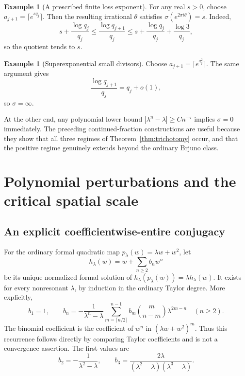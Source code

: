 \documentclass[11pt,a4paper]{article}
\numberwithin{equation}{section}
\theoremstyle{definition}
\newtheorem{example}[theorem]{Example}
\theoremstyle{remark}
\begin{document}
\begin{example}[A prescribed finite loss exponent]\label{ex:positive}
For any real $s>0$, choose
$a_{j+1}=\lceil e^{s q_j}\rceil$. Then the resulting irrational
$\theta$ satisfies $\sigma(e^{2\pi i\theta})=s$.
Indeed,
\[
 s+\frac{\log q_j}{q_j}
 \le\frac{\log q_{j+1}}{q_j}
 \le s+\frac{\log q_j}{q_j}+\frac{\log3}{q_j},
\]
so the quotient tends to $s$.
\end{example}

\begin{example}[Superexponential small divisors]\label{ex:infinite}
Choose $a_{j+1}=\lceil e^{q_j^2}\rceil$. The same argument gives
\[
 \frac{\log q_{j+1}}{q_j}=q_j+o(1),
\]
so $\sigma=\infty$.
\end{example}

At the other end, any polynomial lower bound
$|\lambda^n-\lambda|\ge Cn^{-\tau}$ implies $\sigma=0$ immediately.
The preceding continued-fraction constructions are useful because they
show that all three regimes of Theorem~\ref{thm:trichotomy} occur, and that
the positive regime genuinely extends beyond the ordinary Brjuno class.

\section{Polynomial perturbations and the critical spatial scale}\label{sec:quadratic}

\subsection{An explicit coefficientwise-entire conjugacy}

For the ordinary formal quadratic map
$p_\lambda(w)=\lambda w+w^2$, let
\[
 h_\lambda(w)=w+\sum_{n\ge2}b_n w^n
\]
be its unique normalized formal solution of
$h_\lambda(p_\lambda(w))=\lambda h_\lambda(w)$.
It exists for every nonresonant $\lambda$, by induction in the ordinary
Taylor degree. More explicitly,
\begin{equation}\label{eq:quadraticrecurrence}
 b_1=1,\qquad
 b_n=-\frac{1}{\lambda^n-\lambda}
       \sum_{m=\lceil n/2\rceil}^{n-1}
         b_m\binom m{n-m}\lambda^{2m-n}
       \quad(n\ge2).
\end{equation}
The binomial coefficient is the coefficient of $w^n$ in
$(\lambda w+w^2)^m$. Thus this recurrence follows directly by comparing
Taylor coefficients and is not a convergence assertion.
The first values are
\[
 b_2=-\frac1{\lambda^2-\lambda},\qquad
 b_3=\frac{2\lambda}{(\lambda^2-\lambda)(\lambda^3-\lambda)}.
\]
\end{document}
